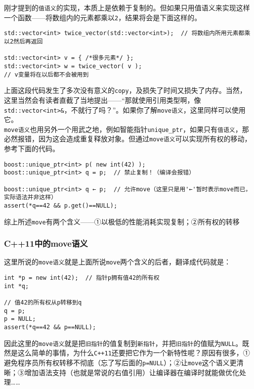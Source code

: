 刚才提到的\texttt{值语义}的实现，本质上是依赖于复制的。但如果只用值语义来实现这样一个函数------将数组内的元素都乘以\texttt{2}，结果将会是下面这样的。

\begin{lstlisting}
std::vector<int> twice_vector(std::vector<int>);  // 将数组内所用元素都乘以2然后再返回

std::vector<int> v = { /*很多元素*/ };
std::vector<int> w = twice_vector( v ); 
// v变量将在以后都不会被用到
\end{lstlisting}

上面这段代码发生了多次没有意义的\texttt{copy}，及损失了时间又损失了内存。当然，这里当然会有读者直截了当地提出------``那就使用引用类型啊，像\texttt{std::vector\textless{}int\textgreater{}\&}，不就行了吗？''。如果你了解\texttt{move语义}，这里同样可以使用它。\\
\texttt{move语义}也用另外一个用武之地，例如智能指针\texttt{unique\_ptr}，如果只有\texttt{值语义}，那必然报错，因为这会造成重复释放对象。但通过\texttt{move语义}可以实现所有权的移动，参考下面的代码。

\begin{lstlisting}
boost::unique_ptr<int> p( new int(42) );
boost::unique_ptr<int> q = p;  // 禁止复制！（编译会报错）

boost::unique_ptr<int> q ← p;  // 允许move（这里只是用'←'暂时表示move而已，实际语法并非这样）
assert(*q==42 && p.get()==NULL);
\end{lstlisting}

综上所述\texttt{move}有两个含义------①以极低的性能消耗实现复制；②所有权的转移

\subsubsection[C++11中的move语义]{\texorpdfstring{\protect\hypertarget{14C11move_48}{}{}C++11中的move语义}{1.4.C++11中的move语义}}\label{c11ux4e2dux7684moveux8bedux4e49}

这里所说的\texttt{move语义}就是上面所说\texttt{move}两个含义的后者，翻译成代码就是：

\begin{lstlisting}
int *p = new int(42);  // 指针p拥有值42的所有权
int *q;

// 值42的所有权从p转移到q
q = p;
p = NULL;
assert(*q==42 && p==NULL);
\end{lstlisting}

因此这里的\texttt{move语义}就是把\texttt{旧指针}的值复制到\texttt{新指针}，并把\texttt{旧指针}的值赋为\texttt{NULL}。既然是这么简单的事情，为什么\texttt{C++11}还要把它作为一个新特性呢？原因有很多，①避免程序员所有权转移不彻底（忘了写后面的\texttt{p=NULL}）；②让\texttt{move}这个语义更清晰；③增加语法支持（也就是常说的右值引用）让编译器在编译时就能做优化处理\ldots{}\ldots{}

